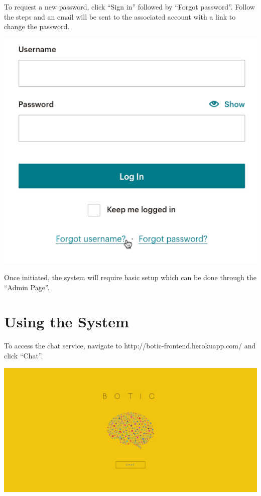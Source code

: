 \documentclass[11pt]{article}
\begin{document}
\begin{flushleft}
	To request a new password, click “Sign in” followed by “Forgot password”. Follow the steps and an email will be sent to the associated account with a link to change the password.
\end{flushleft}
\includegraphics[width=1.0\textwidth]{images/Login.png}

\begin{flushleft}
	Once initiated, the system will require basic setup which can be done through the “Admin Page”.
\end{flushleft}

\section{Using the System}
\begin{flushleft}
	To access the chat service, navigate to http://botic-frontend.herokuapp.com/ and click “Chat”.
\end{flushleft}
\includegraphics[width=1.0\textwidth]{images/Landing.png}
\end{document}
